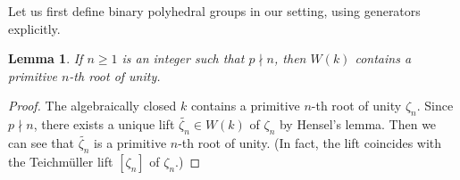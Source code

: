 \documentclass[uplatex,11pt,a4paper]{amsart} %
\numberwithin{equation}{section}
\numberwithin{figure}{section}
\numberwithin{table}{section}
\theoremstyle{plain}
\newtheorem{lemma}[theorem]{Lemma}
\theoremstyle{definition}
\newcommand{\wt}{\widetilde}
\begin{document}
Let us first define binary polyhedral groups in our setting, using generators explicitly.

\begin{lemma}
\label{lem:zetaWk}
If $n\geq 1$ is an integer such that $p\nmid n$, then $W(k)$ contains a primitive $n$-th root of unity.
\end{lemma}

\begin{proof}
The algebraically closed $k$ contains a primitive $n$-th root of unity $\zeta_n$. Since $p\nmid n$, there exists a unique lift $\wt{\zeta_n}\in W(k)$ of $\zeta_n$ by Hensel's lemma. Then we can see that $\wt{\zeta_n}$ is a primitive $n$-th root of unity. (In fact, the lift coincides with the Teichm\"{u}ller lift $[\zeta_n]$ of $\zeta_n$.)
\end{proof}
\end{document}
